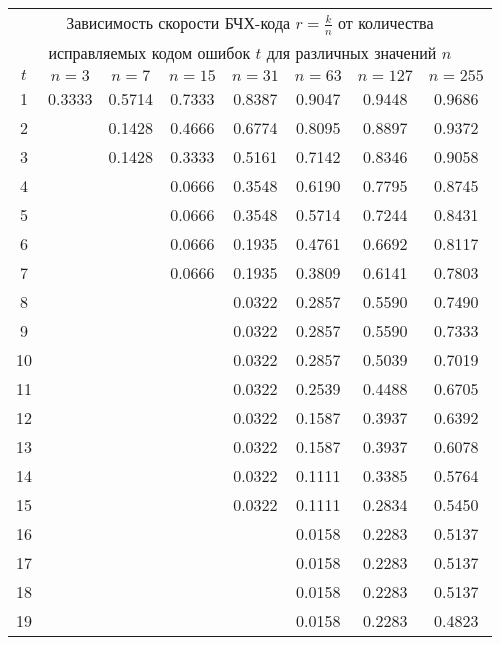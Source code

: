 \documentclass[12pt]{article}
\begin{document}
    \begin{center}
        \tiny
        \begin{longtable}{|c|c|c|c|c|c|c|c|}
            \hline
            \multicolumn{8}{|c|}{Зависимость скорости БЧХ-кода $r=\frac{k}{n}$ от количества} \\
            \multicolumn{8}{|c|}{исправляемых кодом ошибок $t$ для различных значений $n$} \\
            \hline
            $t$ & $n = 3$ & $n = 7$ & $n = 15$ & $n = 31$ & $n = 63$ & $n = 127$ & $n = 255$ \\
            \hline
            1 & 0.3333 & 0.5714 & 0.7333 & 0.8387 & 0.9047 & 0.9448 & 0.9686 \\
            2 &  & 0.1428 & 0.4666 & 0.6774 & 0.8095 & 0.8897 & 0.9372 \\
            3 &  & 0.1428 & 0.3333 & 0.5161 & 0.7142 & 0.8346 & 0.9058 \\
            4 &  &  & 0.0666 & 0.3548 & 0.6190 & 0.7795 & 0.8745 \\
            5 &  &  & 0.0666 & 0.3548 & 0.5714 & 0.7244 & 0.8431 \\
            6 &  &  & 0.0666 & 0.1935 & 0.4761 & 0.6692 & 0.8117 \\
            7 &  &  & 0.0666 & 0.1935 & 0.3809 & 0.6141 & 0.7803 \\
            8 &  &  &  & 0.0322 & 0.2857 & 0.5590 & 0.7490 \\
            9 &  &  &  & 0.0322 & 0.2857 & 0.5590 & 0.7333 \\
            10 &  &  &  & 0.0322 & 0.2857 & 0.5039 & 0.7019 \\
            11 &  &  &  & 0.0322 & 0.2539 & 0.4488 & 0.6705 \\
            12 &  &  &  & 0.0322 & 0.1587 & 0.3937 & 0.6392 \\
            13 &  &  &  & 0.0322 & 0.1587 & 0.3937 & 0.6078 \\
            14 &  &  &  & 0.0322 & 0.1111 & 0.3385 & 0.5764 \\
            15 &  &  &  & 0.0322 & 0.1111 & 0.2834 & 0.5450 \\
            16 &  &  &  &  & 0.0158 & 0.2283 & 0.5137 \\
            17 &  &  &  &  & 0.0158 & 0.2283 & 0.5137 \\
            18 &  &  &  &  & 0.0158 & 0.2283 & 0.5137 \\
            19 &  &  &  &  & 0.0158 & 0.2283 & 0.4823 \\

\end{longtable}
\end{center}
\end{document}
